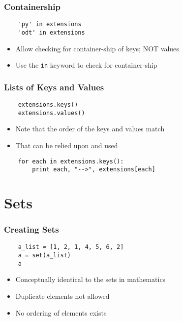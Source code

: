 \begin{frame}[fragile]
  \frametitle{Containership}
  \begin{lstlisting}
    'py' in extensions
    'odt' in extensions
  \end{lstlisting}
  \begin{itemize}
  \item Allow checking for container-ship of keys; NOT values
  \item Use the \texttt{in} keyword to check for container-ship
  \end{itemize}
\end{frame}

\begin{frame}[fragile]
  \frametitle{Lists of Keys and Values}
  \begin{lstlisting}
    extensions.keys()
    extensions.values()
  \end{lstlisting}
  \begin{itemize}
  \item Note that the order of the keys and values match
  \item That can be relied upon and used
  \end{itemize}
  \begin{lstlisting}
    for each in extensions.keys():
        print each, "-->", extensions[each]
  \end{lstlisting}
\end{frame}

\section{Sets}

\begin{frame}[fragile]
  \frametitle{Creating Sets}
  \begin{lstlisting}
    a_list = [1, 2, 1, 4, 5, 6, 2]
    a = set(a_list)
    a
  \end{lstlisting}
  \begin{itemize}
  \item Conceptually identical to the sets in mathematics
  \item Duplicate elements not allowed
  \item No ordering of elements exists
  \end{itemize}
\end{frame}

